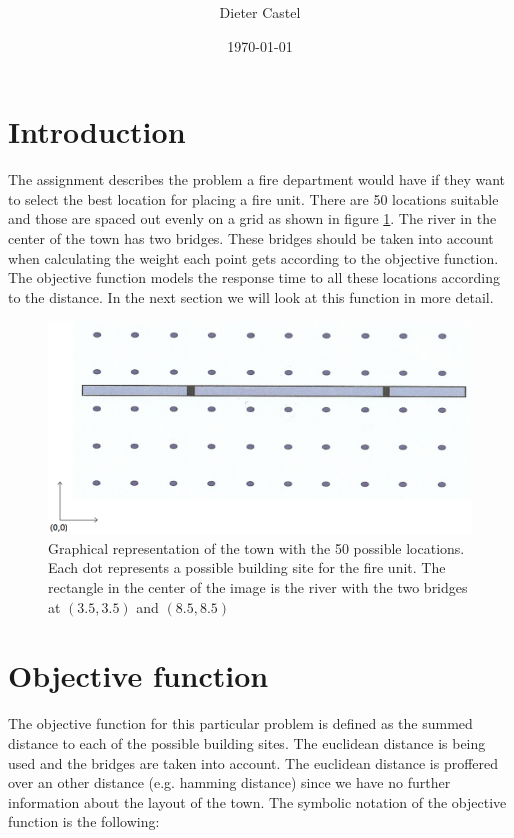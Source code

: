 \documentclass[11pt,a4paper,oneside]{article}
\title{\maintitle \\ \teacherstitle}
\date{\today}
\author{Dieter Castel}
\begin{document}
\maketitle
\tableofcontents
\listoffigures
\listoflistings
\newpage

\section{Introduction}
The assignment describes the problem a fire department would have if they want to select the best location for placing a fire unit.
There are 50 locations suitable and those are spaced out evenly on a grid as shown in figure \ref{fig:assig}.
The river in the center of the town has two bridges.
These bridges should be taken into account when calculating the weight each point gets according to the objective function.
The objective function models the response time to all these locations according to the distance. In the next section we will look at this function in more detail.
\begin{figure}
		\centering
		\includegraphics[scale=0.3]{assignment.png}
		\caption{Graphical representation of the town with the 50 possible locations. Each dot represents a possible building site for the fire unit. The rectangle in the center of the image is the river with the two bridges at $(3.5,3.5)$ and $(8.5,8.5)$}
		\label{fig:assig}
\end{figure}

\section{Objective function}
The objective function for this particular problem is defined as the summed distance to each of the possible building sites.
The euclidean distance is being used and the bridges are taken into account.
The euclidean distance is proffered over an other distance (e.g. hamming distance) since we have no further information about the layout of the town.
The symbolic notation of the objective function is the following:
\end{document}
